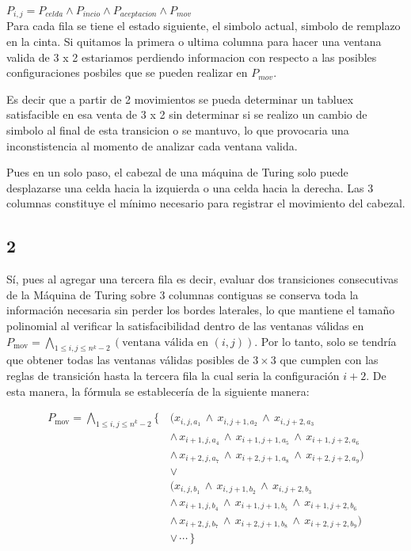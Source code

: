     $P_{i,j} = P_{celda} \land P_{incio} \land P_{aceptacion} \land P_{mov}$\\
    
    Para cada fila se tiene el estado siguiente, el simbolo actual, simbolo de remplazo en la cinta. Si quitamos la primera o ultima columna para hacer una ventana valida de 3 x 2 estariamos perdiendo informacion con respecto a las posibles configuraciones posbiles que se pueden realizar en $P_{mov}$.
    
    Es decir que a partir de 2 movimientos se pueda determinar un tabluex satisfacible en esa venta de 3 x 2 sin determinar si se realizo un cambio de simbolo al final de esta transicion o se mantuvo, lo que provocaria una inconstistencia al momento de analizar cada ventana valida.

    Pues en un solo paso, el cabezal de una máquina de Turing solo puede desplazarse una celda hacia la izquierda o una celda hacia la derecha. Las 3 columnas constituye el mínimo necesario para registrar el movimiento del cabezal.
\subsection{2}
Sí, pues al agregar una tercera fila es decir, evaluar dos transiciones consecutivas de la Máquina de Turing sobre 3 columnas contiguas se conserva toda la información  necesaria sin perder los bordes laterales, lo que mantiene el tamaño polinomial al verificar la satisfacibilidad dentro de las ventanas válidas en $P_{\mathrm{mov}} = \bigwedge_{1 \le i,j \le n^k - 2} (\text{ventana válida en } (i,j))$. Por lo tanto, solo se tendría que obtener todas las ventanas válidas posibles de $3 \times 3$ que cumplen con las reglas de transición hasta la tercera fila la cual seria la configuración $i+2$. De esta manera, la fórmula se establecería de la siguiente manera:

    $$\begin{aligned} P_{\mathrm{mov}} = \bigwedge_{1 \le i,j \le n^k - 2} \Big\{ \, & (x_{i,j,a_1} \,\wedge\, x_{i,j+1,a_2} \,\wedge\, x_{i,j+2,a_3} \\ & \wedge\, x_{i+1,j,a_4} \,\wedge\, x_{i+1,j+1,a_5} \,\wedge\, x_{i+1,j+2,a_6} \\ & \wedge\, x_{i+2,j,a_7} \,\wedge\, x_{i+2,j+1,a_8} \,\wedge\, x_{i+2,j+2,a_9}) \\ & \vee \\ & (x_{i,j,b_1} \,\wedge\, x_{i,j+1,b_2} \,\wedge\, x_{i,j+2,b_3} \\ & \wedge\, x_{i+1,j,b_4} \,\wedge\, x_{i+1,j+1,b_5} \,\wedge\, x_{i+1,j+2,b_6} \\ & \wedge\, x_{i+2,j,b_7} \,\wedge\, x_{i+2,j+1,b_8} \,\wedge\, x_{i+2,j+2,b_9}) \\ & \vee\, \cdots \,\Big\} \end{aligned}$$

